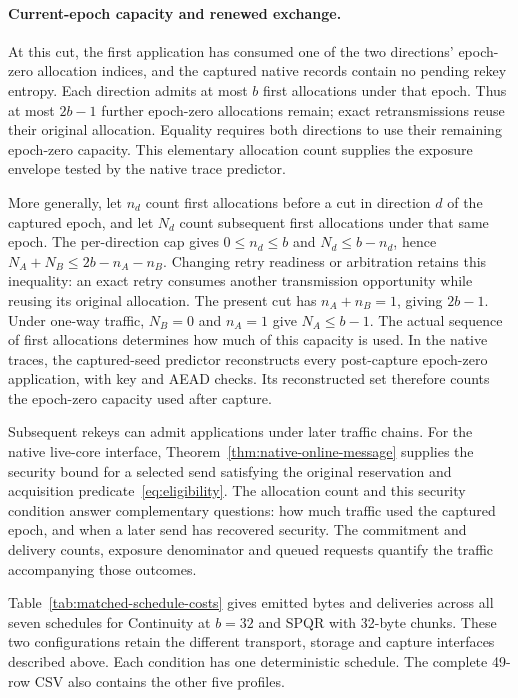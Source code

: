 \paragraph{Current-epoch capacity and renewed exchange.}
At this cut, the first application has consumed one of the two directions'
epoch-zero allocation indices, and the captured native records contain no
pending rekey entropy. Each direction admits at most $b$ first allocations
under that epoch. Thus at most $2b-1$ further epoch-zero allocations remain;
exact retransmissions reuse their original allocation. Equality requires both
directions to use their remaining epoch-zero capacity. This elementary
allocation count supplies the exposure envelope tested by the native trace
predictor.

More generally, let $n_d$ count first allocations before a cut in direction
$d$ of the captured epoch, and let $N_d$ count subsequent first allocations
under that same epoch. The per-direction cap gives $0\le n_d\le b$ and
$N_d\le b-n_d$, hence $N_A+N_B\le2b-n_A-n_B$.
Changing retry readiness or arbitration retains this inequality: an exact
retry consumes another transmission opportunity while reusing its original
allocation. The present cut has $n_A+n_B=1$, giving $2b-1$.
Under one-way traffic, $N_B=0$ and $n_A=1$ give $N_A\le b-1$.
The actual sequence of first allocations determines how much of this
capacity is used. In the native traces, the captured-seed predictor reconstructs
every post-capture epoch-zero application, with key and AEAD checks. Its
reconstructed set therefore counts the epoch-zero capacity used after
capture.

Subsequent rekeys can admit applications under later traffic chains. For the
native live-core interface, Theorem~\ref{thm:native-online-message}
supplies the security bound for a selected send satisfying the original
reservation and acquisition predicate~\eqref{eq:eligibility}. The
allocation count and this security condition answer complementary
questions: how much traffic used the captured epoch, and when a later send
has recovered security. The commitment and delivery counts, exposure
denominator and queued requests quantify the traffic accompanying those
outcomes.



Table~\ref{tab:matched-schedule-costs} gives emitted bytes and deliveries
across all seven schedules for Continuity at $b=32$ and SPQR with 32-byte
chunks. These two configurations retain the different transport, storage
and capture interfaces described above. Each condition has one deterministic
schedule. The complete 49-row CSV also contains the other five profiles.

